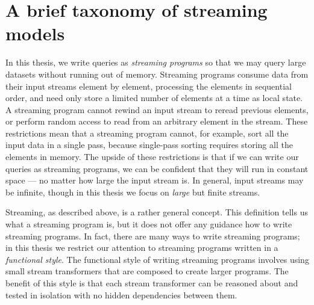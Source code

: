\chapter{A brief taxonomy of streaming models}
\label{taxonomy}

In this thesis, we write queries as \emph{streaming programs} so that we may query large datasets without running out of memory.
Streaming programs consume data from their input streams element by element, processing the elements in sequential order, and need only store a limited number of elements at a time as local state.
A streaming program cannot rewind an input stream to reread previous elements, or perform random access to read from an arbitrary element in the stream.
These restrictions mean that a streaming program cannot, for example, sort all the input data in a single pass, because single-pass sorting requires storing all the elements in memory.
The upside of these restrictions is that if we can write our queries as streaming programs, we can be confident that they will run in constant space --- no matter how large the input stream is.
In general, input streams may be infinite, though in this thesis we focus on \emph{large} but finite streams.


Streaming, as described above, is a rather general concept.
This definition tells us what a streaming program is, but it does not offer any guidance how to write streaming programs.
In fact, there are many ways to write streaming programs; in this thesis we restrict our attention to streaming programs written in a \emph{functional style}.
The functional style of writing streaming programs involves using small stream transformers that are composed to create larger programs.
The benefit of this style is that each stream transformer can be reasoned about and tested in isolation with no hidden dependencies between them.

